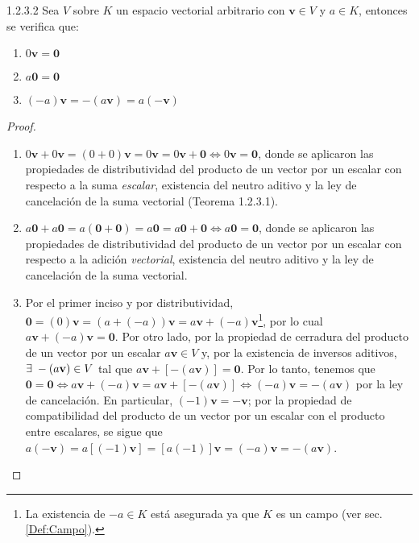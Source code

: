 \documentclass[apuntes]{subfiles}
\begin{document}
\begin{teorema} {1.2.3.2}
Sea $V$ sobre $K$ un espacio vectorial arbitrario con $\mathbf{v}\in V$ y $a\in K$, entonces se verifica que:

\begin{enumerate}
    \item $0\mathbf{v}=\mathbf{0}$
    \item $a\mathbf{0}=\mathbf{0}$
    \item $(-a)\mathbf{v}=-(a\mathbf{v})=a(-\mathbf{v})$
\end{enumerate}

\begin{proof}
\begin{enumerate}
    \item $0\mathbf{v}+0\mathbf{v}=(0+0)\mathbf{v}=0\mathbf{v}=0\mathbf{v}+\mathbf{0}\iff0\mathbf{v}=\mathbf{0}$, donde se aplicaron las propiedades de distributividad del producto de un vector por un escalar con respecto a la suma \emph{escalar}, existencia del neutro aditivo y la ley de cancelación de la suma vectorial (Teorema 1.2.3.1).
    \item $a\mathbf{0}+a\mathbf{0}=a(\mathbf{0}+\mathbf{0})=a\mathbf{0}=a\mathbf{0}+\mathbf{0}\iff a\mathbf{0}=\mathbf{0}$, donde se aplicaron las propiedades de distributividad del producto de un vector por un escalar con respecto a la adición \emph{vectorial}, existencia del neutro aditivo y la ley de cancelación de la suma vectorial.
    \item Por el primer inciso y por distributividad, $\mathbf{0} = (0)\mathbf{v} = (a+(-a))\mathbf{v}=a\mathbf{v}+(-a)\mathbf{v}$\footnote{La existencia de $-a\in K$ está asegurada ya que $K$ es un campo (ver sec. \ref{Def:Campo}).}, por lo cual $a\mathbf{v}+(-a)\mathbf{v}=\mathbf{0}$. Por otro lado, por la propiedad de cerradura del producto de un vector por un escalar $a\mathbf{v}\in V$ y, por la existencia de inversos aditivos, $\exists\hspace{1mm}-(a\mathbf{v})\in V$ tal que $a\mathbf{v}+[-(a\mathbf{v})]=\mathbf{0}$. Por lo tanto, tenemos que $\mathbf{0}=\mathbf{0}\iff a\mathbf{v}+(-a)\mathbf{v}=a\mathbf{v}+[-(a\mathbf{v})]\iff (-a)\mathbf{v}=-(a\mathbf{v})$ por la ley de cancelación. En particular, $(-1)\mathbf{v}=-\mathbf{v}$; por la propiedad de compatibilidad del producto de un vector por un escalar con el producto entre escalares, se sigue que $a(-\mathbf{v})=a[(-1)\mathbf{v}]=[a(-1)]\mathbf{v}=(-a)\mathbf{v}=-(a\mathbf{v})$.
\end{enumerate}
\end{proof}
\end{teorema}
\end{document}
